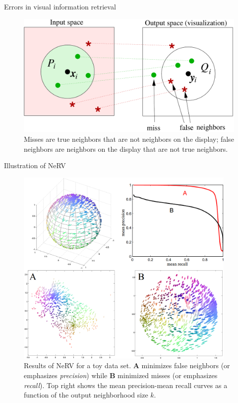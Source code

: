 \documentclass[first=dgreen,second=purple,logo=yellowexc]{aaltoslides}
\begin{document}
\begin{frame}{Errors in visual information retrieval}
\begin{figure}
\centering
\includegraphics[width=\textwidth]{figures/retrieval_illustration.pdf}
\caption{\footnotesize{Misses are true neighbors that are not neighbors on the display; false neighbors are neighbors on the display that are not true neighbors.}}
\end{figure}
\end{frame}


\begin{frame}{Illustration of NeRV}
\begin{figure}
\begin{columns}
\begin{column}{0.65\textwidth}
\includegraphics[width=\textwidth]{figures/demo.png}
\end{column}
\begin{column}{0.3\textwidth}
\caption{\scriptsize{Results of NeRV for a toy data set. \textbf{A} minimizes false neighbors (or emphasizes \emph{precision}) while \textbf{B} minimized misses (or emphasizes \emph{recall}). Top right shows the mean precision-mean recall curves as a function of the output neighborhood size $k$.}}
\end{column}
\end{columns}
\end{figure}
\end{frame}
\end{document}
